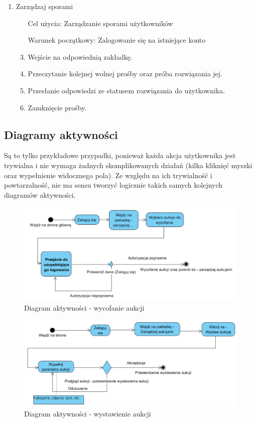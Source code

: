 \documentclass[10pt,titlepage]{article} %
\begin{document}
\begin{enumerate}[1.]
\item Zarządzaj sporami
\begin{enumerate}
\item[Cel użycia:] Zarządzanie sporami użytkowników
\item[Warunek początkowy:] Zalogowanie się na istniejące konto
\item Wejście na odpowiednią zakładkę.
\item Przeczytanie kolejnej wolnej prośby oraz próba rozwiązania jej.
\item Przesłanie odpowiedzi ze statusem rozwiązania do użytkownika.
\item Zamknięcie prośby.
\end{enumerate}

\end{enumerate}
\newpage
\subsection{Diagramy aktywności}
Są to tylko przykładowe przypadki, ponieważ każda akcja użytkownika jest trywialna i nie wymaga żadnych skomplikowanych działań (kilka kliknięć myszki oraz wypełnienie widocznego pola). Ze względu na ich trywialność i powtarzalność, nie ma sensu tworzyć logicznie takich samych kolejnych diagramów aktywności.

\begin{figure}[H]
\includegraphics[width=\textwidth]{img/sekcja2/wycofajAukcjeAD}
\caption[Diagram aktywności - wycofanie aukcji]{Diagram aktywności - wycofanie aukcji}
\end{figure}

\begin{figure}[H]
\includegraphics[width=\textwidth]{img/sekcja2/wystawAukcjeAD}
\caption[Diagram aktywności - wystawienie aukcji]{Diagram aktywności - wystawienie aukcji}
\end{figure}
\end{document}
